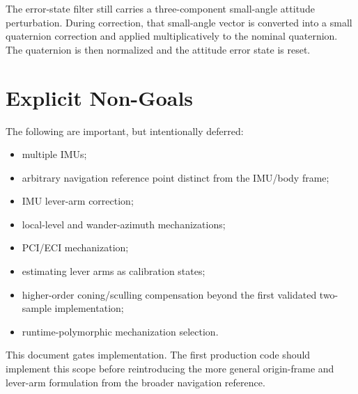 The error-state filter still carries a three-component small-angle attitude
perturbation. During correction, that small-angle vector is converted into a
small quaternion correction and applied multiplicatively to the nominal
quaternion. The quaternion is then normalized and the attitude error state is
reset.

\section{Explicit Non-Goals}

The following are important, but intentionally deferred:
\begin{itemize}
    \item multiple IMUs;
    \item arbitrary navigation reference point distinct from the IMU/body frame;
    \item IMU lever-arm correction;
    \item local-level and wander-azimuth mechanizations;
    \item PCI/ECI mechanization;
    \item estimating lever arms as calibration states;
    \item higher-order coning/sculling compensation beyond the first validated
    two-sample implementation;
    \item runtime-polymorphic mechanization selection.
\end{itemize}

\begin{implbox}
This document gates implementation. The first production code should implement
this scope before reintroducing the more general origin-frame and lever-arm
formulation from the broader navigation reference.
\end{implbox}
